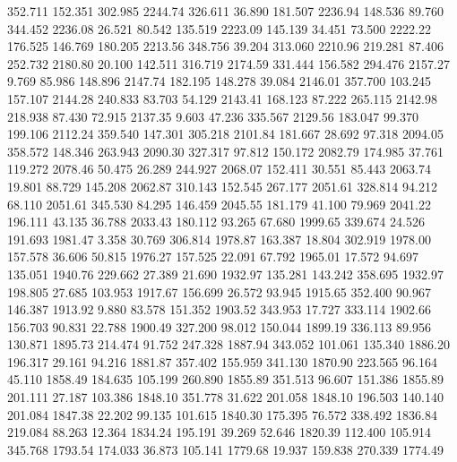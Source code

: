  352.711  152.351  302.985      2244.74
 326.611   36.890  181.507      2236.94
 148.536   89.760  344.452      2236.08
  26.521   80.542  135.519      2223.09
 145.139   34.451   73.500      2222.22
 176.525  146.769  180.205      2213.56
 348.756   39.204  313.060      2210.96
 219.281   87.406  252.732      2180.80
  20.100  142.511  316.719      2174.59
 331.444  156.582  294.476      2157.27
   9.769   85.986  148.896      2147.74
 182.195  148.278   39.084      2146.01
 357.700  103.245  157.107      2144.28
 240.833   83.703   54.129      2143.41
 168.123   87.222  265.115      2142.98
 218.938   87.430   72.915      2137.35
   9.603   47.236  335.567      2129.56
 183.047   99.370  199.106      2112.24
 359.540  147.301  305.218      2101.84
 181.667   28.692   97.318      2094.05
 358.572  148.346  263.943      2090.30
 327.317   97.812  150.172      2082.79
 174.985   37.761  119.272      2078.46
  50.475   26.289  244.927      2068.07
 152.411   30.551   85.443      2063.74
  19.801   88.729  145.208      2062.87
 310.143  152.545  267.177      2051.61
 328.814   94.212   68.110      2051.61
 345.530   84.295  146.459      2045.55
 181.179   41.100   79.969      2041.22
 196.111   43.135   36.788      2033.43
 180.112   93.265   67.680      1999.65
 339.674   24.526  191.693      1981.47
   3.358   30.769  306.814      1978.87
 163.387   18.804  302.919      1978.00
 157.578   36.606   50.815      1976.27
 157.525   22.091   67.792      1965.01
  17.572   94.697  135.051      1940.76
 229.662   27.389   21.690      1932.97
 135.281  143.242  358.695      1932.97
 198.805   27.685  103.953      1917.67
 156.699   26.572   93.945      1915.65
 352.400   90.967  146.387      1913.92
   9.880   83.578  151.352      1903.52
 343.953   17.727  333.114      1902.66
 156.703   90.831   22.788      1900.49
 327.200   98.012  150.044      1899.19
 336.113   89.956  130.871      1895.73
 214.474   91.752  247.328      1887.94
 343.052  101.061  135.340      1886.20
 196.317   29.161   94.216      1881.87
 357.402  155.959  341.130      1870.90
 223.565   96.164   45.110      1858.49
 184.635  105.199  260.890      1855.89
 351.513   96.607  151.386      1855.89
 201.111   27.187  103.386      1848.10
 351.778   31.622  201.058      1848.10
 196.503  140.140  201.084      1847.38
  22.202   99.135  101.615      1840.30
 175.395   76.572  338.492      1836.84
 219.084   88.263   12.364      1834.24
 195.191   39.269   52.646      1820.39
 112.400  105.914  345.768      1793.54
 174.033   36.873  105.141      1779.68
  19.937  159.838  270.339      1774.49
